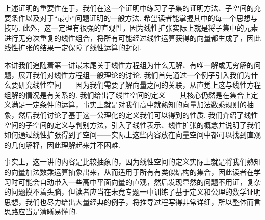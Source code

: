 上述证明的重要性在于，我们在这一个证明中练习了子集的证明方法、子空间的充要条件以及对于``最小''问题证明的一般方法. 希望读者能掌握其中的每一个思想与技巧. 此外，这一定理有很强的直观性，因为线性扩张实际上就是将子集中的元素进行无穷次重复的线性组合，将所有可能经过线性运算获得的向量都生成了，因此线性扩张的结果一定保障了线性运算的封闭.

\begin{summary}

    本讲我们追随着第一讲最末尾关于线性方程组为什么无解、有唯一解或无穷解的问题，展开我们对线性方程组一般理论的讨论. 我们首先通过一个例子引入我们为什么要研究线性空间——因为我们需要了解向量之间的关联，从直觉上这与线性方程组解的情况是有关系的. 我们给出了线性空间的定义——其核心仍然是在集合上定义满足一定条件的运算，事实上就是对我们高中就熟知的向量加法数乘规则的抽象，然后我们讨论了基于这一公理化的定义我们可以得到的性质. 我们介绍了线性空间的子空间的定义与判别方法，引入了线性表示、线性扩张的概念并说明了我们如何通过线性扩张得到子空间——实际上这些内容放在向量空间中都可以找到直观的几何解释，因此理解起来并不困难.

    事实上，这一讲的内容是比较抽象的，因为线性空间的定义实际上就是将我们熟知的向量加法数乘运算抽象出来，从而适用于所有有类似结构的集合，因此读者在学习时可能会自动带入一些高中平面向量的直观，然后发现显然的问题不用证，复杂的问题摸不着头脑，但读者应当在未竟专题一中训练了基于定义和公理的数学证明思想，我们也尽力给出大量经典的例子，将推导过程写得非常详细，所以整体而言思路应当是清晰易懂的.

\end{summary}

